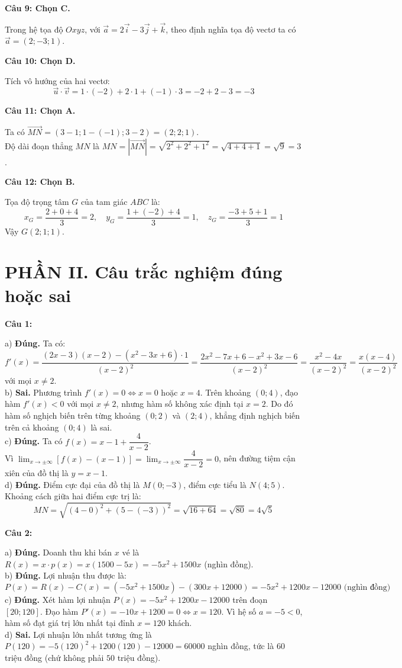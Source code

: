 \documentclass[12pt,a4paper]{article}
\newcommand{\loigiai}[1]{\par\medskip\Needspace{4\baselineskip}\noindent\textbf{#1}\par\nobreak}
\begin{document}
\loigiai{Câu 9: Chọn C.}
Trong hệ tọa độ $Oxyz$, với $\vec a=2\vec i-3\vec j+\vec k$, theo định nghĩa tọa độ vectơ ta có $\vec a=(2;-3;1)$.

\loigiai{Câu 10: Chọn D.}
Tích vô hướng của hai vectơ:
\[ \vec u\cdot\vec v=1\cdot(-2)+2\cdot1+(-1)\cdot3=-2+2-3=-3 \]

\loigiai{Câu 11: Chọn A.}
Ta có $\overrightarrow{MN}=(3-1;1-(-1);3-2)=(2;2;1)$.\\
Độ dài đoạn thẳng $MN$ là $MN=|\overrightarrow{MN}|=\sqrt{2^2+2^2+1^2}=\sqrt{4+4+1}=\sqrt9=3$.

\loigiai{Câu 12: Chọn B.}
Tọa độ trọng tâm $G$ của tam giác $ABC$ là:
\[ x_G=\dfrac{2+0+4}{3}=2,\quad y_G=\dfrac{1+(-2)+4}{3}=1,\quad z_G=\dfrac{-3+5+1}{3}=1 \]
Vậy $G(2;1;1)$.

\section*{PHẦN II. Câu trắc nghiệm đúng hoặc sai}

\loigiai{Câu 1:}
a) \textbf{Đúng.} Ta có:
\[ f'(x)=\dfrac{(2x-3)(x-2)-(x^2-3x+6)\cdot1}{(x-2)^2}=\dfrac{2x^2-7x+6-x^2+3x-6}{(x-2)^2}=\dfrac{x^2-4x}{(x-2)^2}=\dfrac{x(x-4)}{(x-2)^2} \]
với mọi $x\ne2$.\\
b) \textbf{Sai.} Phương trình $f'(x)=0\iff x=0$ hoặc $x=4$. Trên khoảng $(0;4)$, đạo hàm $f'(x)<0$ với mọi $x\ne2$, nhưng hàm số không xác định tại $x=2$. Do đó hàm số nghịch biến trên từng khoảng $(0;2)$ và $(2;4)$, khẳng định nghịch biến trên cả khoảng $(0;4)$ là sai.\\
c) \textbf{Đúng.} Ta có $f(x)=x-1+\dfrac{4}{x-2}$.\\
Vì $\lim_{x\to\pm\infty}[f(x)-(x-1)]=\lim_{x\to\pm\infty}\dfrac{4}{x-2}=0$, nên đường tiệm cận xiên của đồ thị là $y=x-1$.\\
d) \textbf{Đúng.} Điểm cực đại của đồ thị là $M(0;-3)$, điểm cực tiểu là $N(4;5)$. Khoảng cách giữa hai điểm cực trị là:
\[ MN=\sqrt{(4-0)^2+(5-(-3))^2}=\sqrt{16+64}=\sqrt{80}=4\sqrt5 \]

\loigiai{Câu 2:}
a) \textbf{Đúng.} Doanh thu khi bán $x$ vé là $R(x)=x\cdot p(x)=x(1500-5x)=-5x^2+1500x$ (nghìn đồng).\\
b) \textbf{Đúng.} Lợi nhuận thu được là:
\[ P(x)=R(x)-C(x)=(-5x^2+1500x)-(300x+12000)=-5x^2+1200x-12000\text{ (nghìn đồng)} \]
c) \textbf{Đúng.} Xét hàm lợi nhuận $P(x)=-5x^2+1200x-12000$ trên đoạn $[20;120]$. Đạo hàm $P'(x)=-10x+1200=0\iff x=120$. Vì hệ số $a=-5<0$, hàm số đạt giá trị lớn nhất tại đỉnh $x=120$ khách.\\
d) \textbf{Sai.} Lợi nhuận lớn nhất tương ứng là $P(120)=-5(120)^2+1200(120)-12000=60000$ nghìn đồng, tức là $60$ triệu đồng (chứ không phải $50$ triệu đồng).
\end{document}
